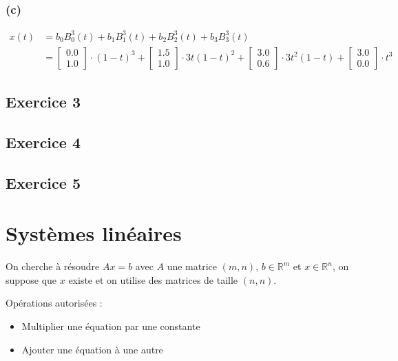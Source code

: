 \documentclass[11pt,a4paper]{report}
\newcommand{\matv}[2]{\begin{bmatrix}#1 \\ #2 \end{bmatrix}}
\begin{document}
\subsection*{(c)}
\begin{align*}
x(t) &= b_0B^3_0(t) + b_1B^3_1(t) + b_2B^3_2(t) + b_3B^3_3(t) \\
     &= \matv{0.0}{1.0} \cdot (1-t)^3 + \matv{1.5}{1.0} \cdot 3t(1-t)^2 + \matv{3.0}{0.6} \cdot 3t^2(1-t) + \matv{3.0}{0.0} \cdot t^3
\end{align*}

\section{Exercice 3}
\section{Exercice 4}
\section{Exercice 5}


\chapter{Systèmes linéaires}
On cherche à résoudre $Ax=b$ avec $A$ une matrice $(m,n)$, $b\in \mathbb{R}^m$ et $x\in \mathbb{R}^n$, on suppose que $x$ existe et on utilise des matrices de taille $(n,n)$.

Opérations autorisées :
\begin{itemize}
    \item Multiplier une équation par une constante
    \item Ajouter une équation à une autre
\end{itemize}
\end{document}

